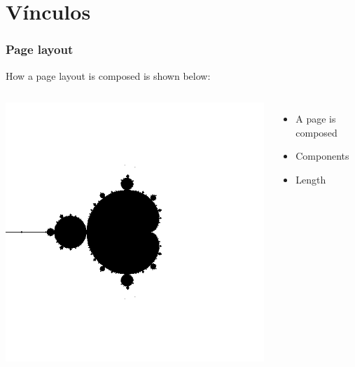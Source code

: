 \documentclass[12pt, aspectratio = 169]{beamer}
\begin{document}
    \section{Vínculos}
        \begin{frame}[t,label = Slide 7.1]
            \frametitle{Page layout}
            How a page layout is composed is shown below:\pause \vskip 5mm
            \begin{columns}
                \includegraphics[width=\textwidth]{image4.png}
                \begin{itemize}[<+-|alert@+>]
                    \item A page is composed \hfill
                    \hyperlink{Slide 7.2}{}
                    \item Components
                    \item Length 
                \end{itemize}
            \end{columns}
        \end{frame}
\end{document}

